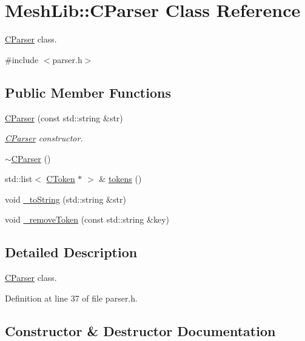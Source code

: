 \hypertarget{class_mesh_lib_1_1_c_parser}{}\section{Mesh\+Lib\+:\+:C\+Parser Class Reference}
\label{class_mesh_lib_1_1_c_parser}


\hyperlink{class_mesh_lib_1_1_c_parser}{C\+Parser} class.  




{\ttfamily \#include $<$parser.\+h$>$}

\subsection*{Public Member Functions}
\begin{DoxyCompactItemize}
\item 
\hyperlink{class_mesh_lib_1_1_c_parser_ad83706c9123828e75b8e9605046e7252}{C\+Parser} (const std\+::string \&str)
\begin{DoxyCompactList}\small\item\em \hyperlink{class_mesh_lib_1_1_c_parser}{C\+Parser} constructor. \end{DoxyCompactList}\item 
\hyperlink{class_mesh_lib_1_1_c_parser_a58b7b8d1592a340c6600d3ff7b436def}{$\sim$\+C\+Parser} ()
\item 
std\+::list$<$ \hyperlink{class_mesh_lib_1_1_c_token}{C\+Token} $\ast$ $>$ \& \hyperlink{class_mesh_lib_1_1_c_parser_a259f2cc89bc304aa3478c2a9fe937ea5}{tokens} ()
\item 
void \hyperlink{class_mesh_lib_1_1_c_parser_a6cbed1102a9f9c201f66d0e7ec3b2f7c}{\+\_\+to\+String} (std\+::string \&str)
\item 
void \hyperlink{class_mesh_lib_1_1_c_parser_aa506e5dedd06443169d9d4f0d466c378}{\+\_\+remove\+Token} (const std\+::string \&key)
\end{DoxyCompactItemize}


\subsection{Detailed Description}
\hyperlink{class_mesh_lib_1_1_c_parser}{C\+Parser} class. 

Definition at line 37 of file parser.\+h.



\subsection{Constructor \& Destructor Documentation}
